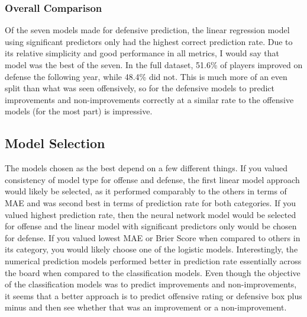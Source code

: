 \documentclass[12pt]{article}
\begin{document}
\subsubsection{Overall Comparison}
\label{subsubsec:ovrdef-results}
Of the seven models made for defensive prediction, the linear regression model using significant predictors only had the highest correct prediction rate. Due to its relative simplicity and good performance in all metrics, I would say that model was the best of the seven. In the full dataset, 51.6\% of players improved on defense the following year, while 48.4\% did not. This is much more of an even split than what was seen offensively, so for the defensive models to predict improvements and non-improvements correctly at a similar rate to the offensive models (for the most part) is impressive.
\subsection{Model Selection}
The models chosen as the best depend on a few different things. If you valued consistency of model type for offense and defense, the first linear model approach would likely be selected, as it performed comparably to the others in terms of MAE and was second best in terms of prediction rate for both categories. If you valued highest prediction rate, then the neural network model would be selected for offense and the linear model with significant predictors only would be chosen for defense. If you valued lowest MAE or Brier Score when compared to others in its category, you would likely choose one of the logistic models. Interestingly, the numerical prediction models performed better in prediction rate essentially across the board when compared to the classification models. Even though the objective of the classification models was to predict improvements and non-improvements, it seems that a better approach is to predict offensive rating or defensive box plus minus and then see whether that was an improvement or a non-improvement.
\end{document}
